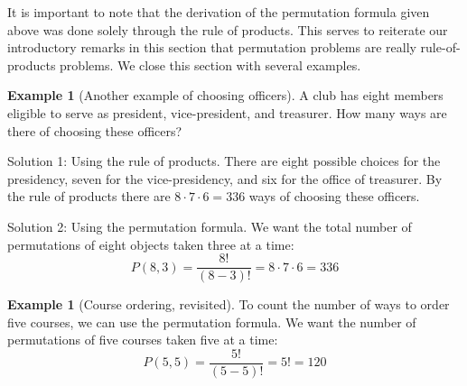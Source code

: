 \documentclass[10pt,]{book}
\theoremstyle{plain}
\theoremstyle{definition}
\theoremstyle{definition}
\newtheorem{example}[theorem]{Example}
\theoremstyle{definition}
\begin{document}
 It is important to note that the derivation of the permutation formula given above was done solely through the rule of products. This serves to reiterate our introductory remarks in this section that permutation problems are really rule-of-products problems.  We close this section with several examples.
%
\begin{example}[Another example of choosing officers]\label{more_club_officers}
A club has eight members eligible to serve as president, vice-president, and treasurer. How many ways are there of choosing these officers?
%
\par

 Solution 1: Using the rule of products. There are eight possible choices for the presidency, seven for the vice-presidency, and six for the office of treasurer. By the rule of products there are \(8 \cdot 7\cdot 6 = 336\) ways of choosing these officers.
%
\par

 Solution 2: Using the permutation formula. We want the total number of permutations of eight objects taken three at a time:
 	\begin{equation*}P(8,3)=\frac{8!}{(8-3)!}=8 \cdot 7 \cdot 6 = 336\end{equation*}
%
\end{example}
\begin{example}[Course ordering, revisited]\label{course-ordering-revisited}
To count the number of ways to order five courses, we can use the permutation formula. We want the number of permutations of five courses taken five at a time:
\begin{equation*}P(5,5)= \frac{5!}{(5-5)!}= 5!= 120\end{equation*}%
\end{example}
\end{document}
